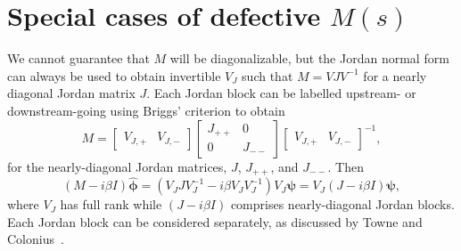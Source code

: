 \section{Special cases of defective $M(s)$}\label{app:defective}

We cannot guarantee that $M$ will be diagonalizable, but the Jordan normal form can always be used to obtain invertible $V_J$ such that $M=VJV^{-1}$ for a nearly diagonal Jordan matrix $J$. Each Jordan block can be labelled upstream- or downstream-going using Briggs' criterion to obtain
\begin{equation}
    M
    =
    \begin{bmatrix}
        V_{J,+} & V_{J,-}
    \end{bmatrix}
    \begin{bmatrix}
        J_{++} & 0\\
        0 & J_{--}
    \end{bmatrix}
    \begin{bmatrix}
        V_{J,+} & V_{J,-}
    \end{bmatrix}^{-1},
\end{equation}
for the nearly-diagonal Jordan matrices, $J$, $J_{++}$, and $J_{--}$. Then
\[
(M-i\beta I)\hat{\bm{\phi}}
=
(V_JJV_J^{-1}-i\beta V_JV_J^{-1})V_J\bm{\psi}
=
V_J(J-i\beta I)\bm{\psi},
\]
where $V_J$ has full rank while $(J-i\beta I)$ comprises nearly-diagonal Jordan blocks. Each Jordan block can be considered separately, as discussed by Towne and Colonius~\cite{Towne_2015_OWNS-O}.